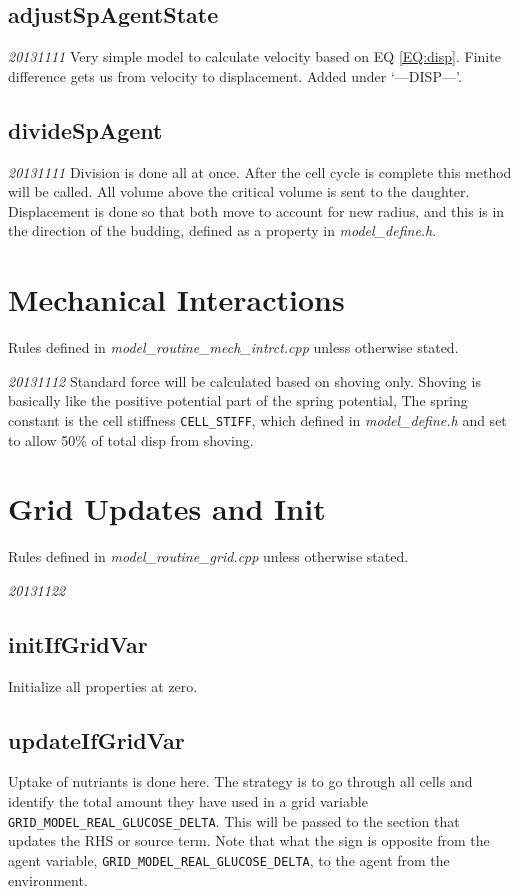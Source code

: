 \documentclass{article}
\begin{document}
\subsection{adjustSpAgentState}
\emph{20131111} Very simple model to calculate velocity based on EQ \ref{EQ:disp}.
Finite difference gets us from velocity to displacement.
Added under `---DISP---'.

\subsection{divideSpAgent}
\emph{20131111} Division is done all at once.  
After the cell cycle is complete this method will be called.
All volume above the critical volume is sent to the daughter.
Displacement is done so that both move to account for new radius, 
and this is in the direction of the budding, defined as a property in \textit{model\_define.h}.
 

\section{Mechanical Interactions}
Rules defined in \textit{model\_routine\_mech\_intrct.cpp} unless otherwise stated.

\emph{20131112} Standard force will be calculated based on shoving only.
Shoving is basically like the positive potential part of the spring potential,
The spring constant is the cell stiffness \texttt{CELL\_STIFF}, 
which defined in \textit{model\_define.h} and set to allow 50\% of total disp from shoving.


\section{Grid Updates and Init}
Rules defined in \textit{model\_routine\_grid.cpp} unless otherwise stated.

\emph{20131122} 
\subsection{initIfGridVar}
Initialize all properties at zero.

\subsection{updateIfGridVar}
Uptake of nutriants is done here. 
The strategy is to go through all cells and identify the total amount they have used in a grid variable \texttt{GRID\_MODEL\_REAL\_GLUCOSE\_DELTA}.
This will be passed to the section that updates the RHS or source term.
Note that what the sign is opposite from the agent variable, \texttt{GRID\_MODEL\_REAL\_GLUCOSE\_DELTA}, 
to the agent from the environment.
\end{document}
